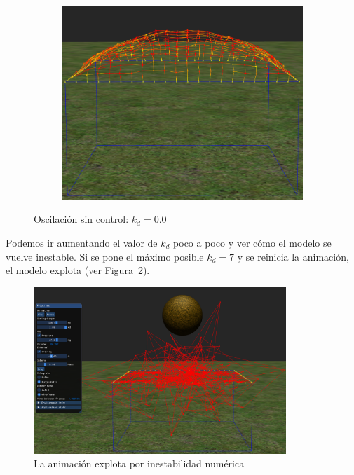 \begin{figure}
\begin{subfigure}[b]{0.30\textwidth}
  \end{subfigure}
~
  \begin{subfigure}[b]{0.30\textwidth}
    \includegraphics[width=\textwidth]{Img/04/noDamp3}
  \end{subfigure}
 \caption[Experimento: Quitar la fuerza del amortiguador]{Oscilación sin control: $k_d=0.0$} 
 \label{res:test1}
\end{figure}

Podemos ir aumentando el valor de $k_d$ poco a poco y ver cómo el modelo se vuelve inestable. 
Si se pone el máximo posible $k_d=7$ y se reinicia la animación, el modelo explota (ver Figura~\ref{res:test4}).

\begin{figure}
 \centering
 \includegraphics[width=0.85\textwidth]{Img/04/maxDamp}
 \caption[Explosión por inestabilidad numérica]{La animación explota por inestabilidad numérica}
 \label{res:test4}
\end{figure}


